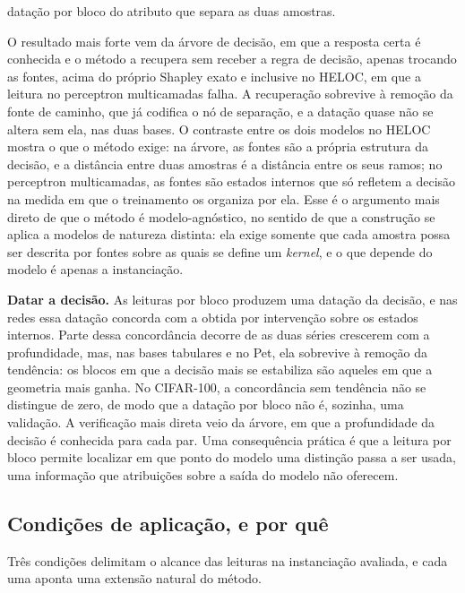 datação por bloco do atributo que separa as duas amostras.

O resultado mais forte vem da árvore de decisão, em que a resposta certa é conhecida e o método a recupera sem receber a regra de decisão, apenas trocando as fontes, acima do próprio Shapley exato e inclusive no HELOC, em que a leitura no perceptron multicamadas falha. A recuperação sobrevive à remoção da fonte de caminho, que já codifica o nó de separação, e a datação quase não se altera sem ela, nas duas bases. O contraste entre os dois modelos no HELOC mostra o que o método exige: na árvore, as fontes são a própria estrutura da decisão, e a distância entre duas amostras é a distância entre os seus ramos; no perceptron multicamadas, as fontes são estados internos que só refletem a decisão na medida em que o treinamento os organiza por ela. Esse é o argumento mais direto de que o método é modelo-agnóstico, no sentido de que a construção se aplica a modelos de natureza distinta: ela exige somente que cada amostra possa ser descrita por fontes sobre as quais se define um \textit{kernel}, e o que depende do modelo é apenas a instanciação.

\textbf{Datar a decisão.} As leituras por bloco produzem uma datação da decisão, e nas redes essa datação concorda com a obtida por intervenção sobre os estados internos. Parte dessa concordância decorre de as duas séries crescerem com a profundidade, mas, nas bases tabulares e no Pet, ela sobrevive à remoção da tendência: os blocos em que a decisão mais se estabiliza são aqueles em que a geometria mais ganha. No CIFAR-100, a concordância sem tendência não se distingue de zero, de modo que a datação por bloco não é, sozinha, uma validação. A verificação mais direta veio da árvore, em que a profundidade da decisão é conhecida para cada par. Uma consequência prática é que a leitura por bloco permite localizar em que ponto do modelo uma distinção passa a ser usada, uma informação que atribuições sobre a saída do modelo não oferecem.

\subsection{Condições de aplicação, e por quê}\label{subsec:disc_limites}

Três condições delimitam o alcance das leituras na instanciação avaliada, e cada uma aponta uma extensão natural do método.

